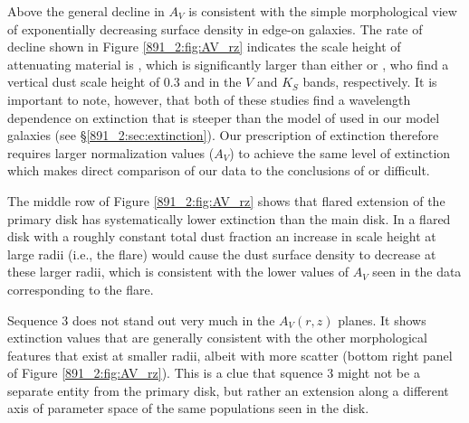 
Above  the general decline in $A_V$ is consistent with
the simple morphological view of exponentially decreasing surface
density in edge-on galaxies. The rate of decline shown in Figure
\ref{891_2:fig:AV_rz} indicates the scale height of attenuating material is
, which is significantly larger than either
\citet{Xilouris99} or \citet{Schechtman-Rook12}, who find a vertical
dust scale height of 0.3 and  in the $V$ and $K_S$
bands, respectively. It is important to note, however, that both of
these studies find a wavelength dependence on extinction that is
steeper than the model of \citet{Charlot00} used in our model galaxies
(see \S\ref{891_2:sec:extinction}). Our prescription of extinction therefore
requires larger normalization values ($A_V$) to achieve the same level
of extinction which makes direct comparison of our data to the
conclusions of \citet{Xilouris99} or \citet{Schechtman-Rook12}
difficult.


The middle row of Figure \ref{891_2:fig:AV_rz} shows that flared
extension of the primary disk has systematically lower extinction than
the main disk. In a flared disk with a roughly constant total dust
fraction an increase in scale height at large radii (i.e., the flare)
would cause the dust surface density to decrease at these larger
radii, which is consistent with the lower values of $A_V$ seen in the
data corresponding to the flare.



Sequence 3 does not stand out very much in the $A_V(r,z)$ planes. It
shows extinction values that are generally consistent with the other
morphological features that exist at smaller radii, albeit with more
scatter (bottom right panel of Figure \ref{891_2:fig:AV_rz}). This is
a clue that squence 3 might not be a separate entity from the primary
disk, but rather an extension along a different axis of parameter
space of the same populations seen in the disk.

